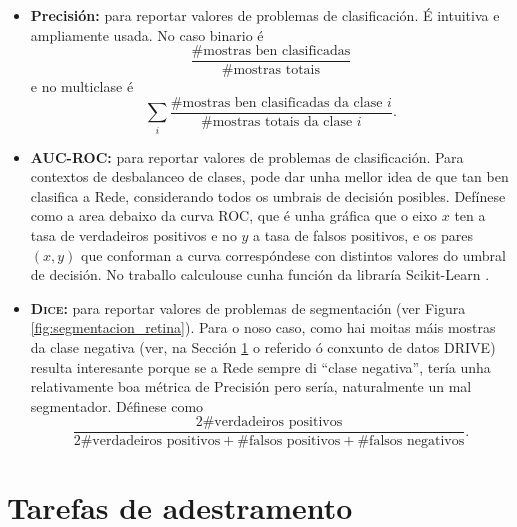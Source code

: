 \begin{itemize}
				\item \textbf{Precisión:} para reportar valores de problemas de clasificación. É intuitiva e ampliamente usada. No caso binario é \[\frac{\#\text{mostras ben clasificadas}}{\#\text{mostras totais}}\] e no multiclase é \[\sum_{i}\frac{\#\text{mostras ben clasificadas da clase }i}{\#\text{mostras totais da clase }i}.\]
				\item \textbf{AUC-ROC:} para reportar valores de problemas de clasificación. Para contextos de desbalanceo de clases, pode dar unha mellor idea de que tan ben clasifica a Rede, considerando todos os umbrais de decisión posibles. Defínese como a area debaixo da curva ROC, que é unha gráfica que o eixo $x$ ten a tasa de verdadeiros positivos e no $y$ a tasa de falsos positivos, e os pares $(x,y)$ que conforman a curva correspóndese con distintos valores do umbral de decisión. No traballo calculouse cunha función da libraría Scikit-Learn \cite{aucroc}.
\item \textbf{\textsc{Dice}:} para reportar valores de problemas de segmentación (ver Figura \ref{fig:segmentacion_retina}). Para o noso caso, como hai moitas máis mostras da clase negativa (ver, na Sección \ref{sec:tarefasadestramento} o referido ó conxunto de datos DRIVE) resulta interesante porque se a Rede sempre di ``clase negativa'', tería unha relativamente boa métrica de Precisión pero sería, naturalmente un mal segmentador. Définese como \[\frac{2\#\text{verdadeiros positivos}}{2\#\text{verdadeiros positivos} + \#\text{falsos positivos} + \#\text{falsos negativos}}.\]
\end{itemize}

\section{Tarefas de adestramento}
\label{sec:tarefasadestramento}

